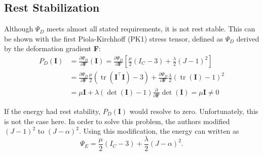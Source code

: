 
\subsection{Rest Stabilization}
Although $\Psi_{D}$ meets almost all stated requirements, it is not rest stable. This can be shown with the first Piola-Kirchhoff (PK1) stress tensor, defined as $\Psi_D$ derived by the deformation gradient \textbf{F}:
\begin{align*}
P_{D}(\mathbf{I}) &= \frac{\partial \Psi_{D}}{\partial \mathbf{F}} (\mathbf{I}) = \frac{\partial \Psi_{D}}{\partial \mathbf{F}} \left[ \frac{\mu}{2}\left(I_{C}-3\right) +\frac{\lambda}{2}(J-1)^{2} \right] \\
&= \frac{\partial \Psi_{D}}{\partial \mathbf{F}}  \frac{\mu}{2}\left(\operatorname{tr}(\mathbf{I}^\intercal \mathbf{I})-3\right) +\frac{\partial \Psi_{D}}{\partial \mathbf{F}} \frac{\lambda}{2}(\operatorname{tr}(\mathbf{I})-1)^{2} \\
&= \mu \mathbf{I} + \lambda (\operatorname{det}(\mathbf{I})-1)  \frac{\partial}{\partial \mathbf{F}} \operatorname{det}(\mathbf{I}) = \mu \mathbf{I} \neq 0
\end{align*}

If the energy had rest stability, $P_{D}(\mathbf{I})$ would resolve to zero. Unfortunately, this is not the case here. In order to solve this problem, the authors modified $(J-1)^{2}$ to $(J-\alpha)^{2}$. Using this modification, the energy can written as
\[
\Psi_{E} = \frac{\mu}{2}\left(I_{C}-3\right) +\frac{\lambda}{2}(J-\alpha)^{2}.
\]

